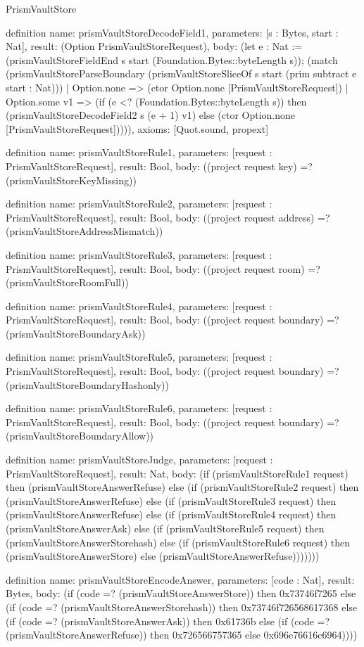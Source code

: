 \begin{lexlean}{PrismVaultStore}
\begin{semanticmodule}
definition{
  name: prismVaultStoreDecodeField1,
  parameters: [s : Bytes, start : Nat],
  result: (Option PrismVaultStoreRequest),
  body: (let e : Nat := (prismVaultStoreFieldEnd s start (Foundation.Bytes::byteLength s)); (match (prismVaultStoreParseBoundary (prismVaultStoreSliceOf s start (prim subtract e start : Nat)))
    | Option.none => (ctor Option.none [PrismVaultStoreRequest])
    | Option.some v1 => (if (e <? (Foundation.Bytes::byteLength s)) then (prismVaultStoreDecodeField2 s (e + 1) v1) else (ctor Option.none [PrismVaultStoreRequest])))),
  axioms: [Quot.sound, propext]
}

definition{
  name: prismVaultStoreRule1,
  parameters: [request : PrismVaultStoreRequest],
  result: Bool,
  body: ((project request key) =? (prismVaultStoreKeyMissing))
}

definition{
  name: prismVaultStoreRule2,
  parameters: [request : PrismVaultStoreRequest],
  result: Bool,
  body: ((project request address) =? (prismVaultStoreAddressMismatch))
}

definition{
  name: prismVaultStoreRule3,
  parameters: [request : PrismVaultStoreRequest],
  result: Bool,
  body: ((project request room) =? (prismVaultStoreRoomFull))
}

definition{
  name: prismVaultStoreRule4,
  parameters: [request : PrismVaultStoreRequest],
  result: Bool,
  body: ((project request boundary) =? (prismVaultStoreBoundaryAsk))
}

definition{
  name: prismVaultStoreRule5,
  parameters: [request : PrismVaultStoreRequest],
  result: Bool,
  body: ((project request boundary) =? (prismVaultStoreBoundaryHashonly))
}

definition{
  name: prismVaultStoreRule6,
  parameters: [request : PrismVaultStoreRequest],
  result: Bool,
  body: ((project request boundary) =? (prismVaultStoreBoundaryAllow))
}

definition{
  name: prismVaultStoreJudge,
  parameters: [request : PrismVaultStoreRequest],
  result: Nat,
  body: (if (prismVaultStoreRule1 request) then (prismVaultStoreAnswerRefuse) else (if (prismVaultStoreRule2 request) then (prismVaultStoreAnswerRefuse) else (if (prismVaultStoreRule3 request) then (prismVaultStoreAnswerRefuse) else (if (prismVaultStoreRule4 request) then (prismVaultStoreAnswerAsk) else (if (prismVaultStoreRule5 request) then (prismVaultStoreAnswerStorehash) else (if (prismVaultStoreRule6 request) then (prismVaultStoreAnswerStore) else (prismVaultStoreAnswerRefuse)))))))
}

definition{
  name: prismVaultStoreEncodeAnswer,
  parameters: [code : Nat],
  result: Bytes,
  body: (if (code =? (prismVaultStoreAnswerStore)) then 0x73746f7265 else (if (code =? (prismVaultStoreAnswerStorehash)) then 0x73746f726568617368 else (if (code =? (prismVaultStoreAnswerAsk)) then 0x61736b else (if (code =? (prismVaultStoreAnswerRefuse)) then 0x726566757365 else 0x696e76616c6964))))
}


\end{semanticmodule}
\end{lexlean}
